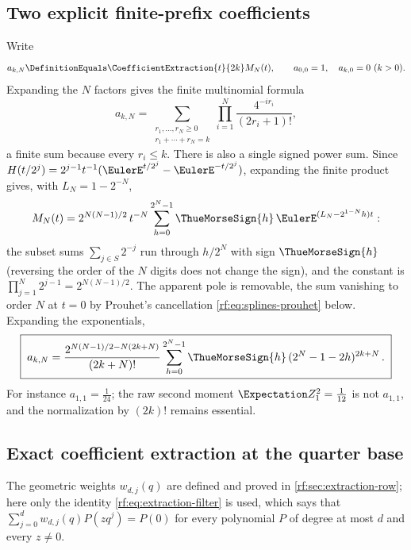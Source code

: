 \documentclass[11pt,oneside]{article}
\theoremstyle{plain}
\theoremstyle{definition}
\theoremstyle{remark}
\newcommand{\tm}[1]{\ThueMorseSign{#1}}     %
\newcommand{\E}{\Expectation}
\newcommand{\coeff}[2]{\CoefficientExtraction{#1}{#2}}
\begin{document}
\subsection{Two explicit finite-prefix coefficients}
\label{rf:sec:prefix-coefficients}

Write
\begin{equation}
 a_{k,N}\DefinitionEquals\coeff{t}{2k}M_{N}(t),\qquad
 a_{0,0}=1,\quad a_{k,0}=0\ (k>0).
 \label{rf:eq:prefix-coefficient}
\end{equation}
Expanding the $N$ factors gives the finite multinomial formula
\begin{equation}
 a_{k,N}=\sum_{\substack{r_{1},\ldots,r_{N}\ge0\\ r_{1}+\cdots+r_{N}=k}}
 \prod_{i=1}^{N}\frac{4^{-ir_{i}}}{(2r_{i}+1)!},
 \label{rf:eq:prefix-multinomial}
\end{equation}
a finite sum because every $r_{i}\le k$.  There is also a single signed
power sum.  Since $H(t/2^{j})=2^{j-1}t^{-1}(\EulerE^{t/2^{j}}-\EulerE^{-t/2^{j}})$,
expanding the finite product gives, with $L_{N}=1-2^{-N}$,
\begin{equation}
 M_{N}(t)=2^{N(N-1)/2}\,t^{-N}\sum_{h=0}^{2^{N}-1}\tm{h}\,
 \EulerE^{(L_{N}-2^{1-N}h)t}:
 \label{rf:eq:prefix-exponentials}
\end{equation}
the subset sums $\sum_{j\in S}2^{-j}$ run through $h/2^{N}$ with sign
$\tm{h}$ (reversing the order of the $N$ digits does not change the sign),
and the constant is $\prod_{j=1}^{N}2^{j-1}=2^{N(N-1)/2}$.  The apparent
pole is removable, the sum vanishing to order $N$ at $t=0$ by Prouhet's
cancellation \cref{rf:eq:splines-prouhet} below.  Expanding the
exponentials,
\begin{equation}
 \boxed{\;
 a_{k,N}=\frac{2^{N(N-1)/2-N(2k+N)}}{(2k+N)!}
 \sum_{h=0}^{2^{N}-1}\tm{h}\,(2^{N}-1-2h)^{2k+N}\,.\;}
 \label{rf:eq:prefix-power}
\end{equation}
For instance $a_{1,1}=\tfrac1{24}$; the raw second moment $\E Z_{1}^{2}=\tfrac1{12}$
is not $a_{1,1}$, and the normalization by $(2k)!$ remains essential.

\subsection{Exact coefficient extraction at the quarter base}
\label{rf:sec:prefix-extraction}

The geometric weights $w_{d,j}(q)$ are defined and proved in
\cref{rf:sec:extraction-row}; here only the identity
\cref{rf:eq:extraction-filter} is used, which says that
$\sum_{j=0}^{d}w_{d,j}(q)P(zq^{j})=P(0)$ for every polynomial $P$ of degree
at most $d$ and every $z\neq0$.
\end{document}
